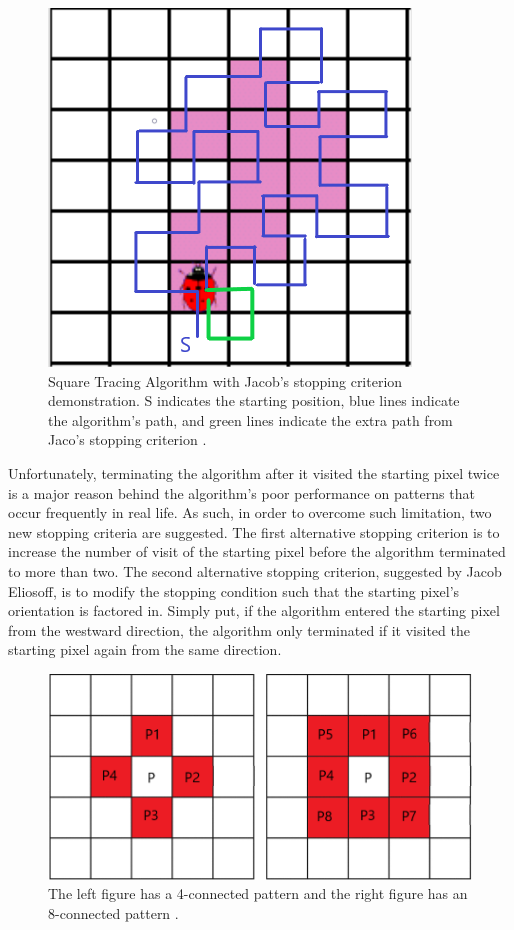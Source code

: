 \documentclass[conference]{IEEEtran}
\begin{document}
\begin{figure}[!htb]
    \centering
    \includegraphics[scale = 0.5]{fig2.png}
    \caption{Square Tracing Algorithm with Jacob's stopping criterion demonstration. S indicates the starting position, blue lines indicate the algorithm's path, and green lines indicate the extra path from Jaco's stopping criterion \cite{sta:2000}.}
\end{figure}

Unfortunately, terminating the algorithm after it visited the starting pixel twice is a major reason behind the algorithm's poor performance on patterns that occur frequently in real life. As such, in order to overcome such limitation, two new stopping criteria are suggested. The first alternative stopping criterion is to increase the number of visit of the starting pixel before the algorithm terminated to more than two. The second alternative stopping criterion, suggested by Jacob Eliosoff, is to modify the stopping condition such that the starting pixel's orientation is factored in. Simply put, if the algorithm entered the starting pixel from the westward direction, the algorithm only terminated if it visited the starting pixel again from the same direction.

\begin{figure}[!htb]
    \centering
    \includegraphics[scale = 0.3]{fig3.png}
    \caption{The left figure has a 4-connected pattern and the right figure has an 8-connected pattern \cite{gct:2010, dc:2000}.}
\end{figure}
\end{document}
